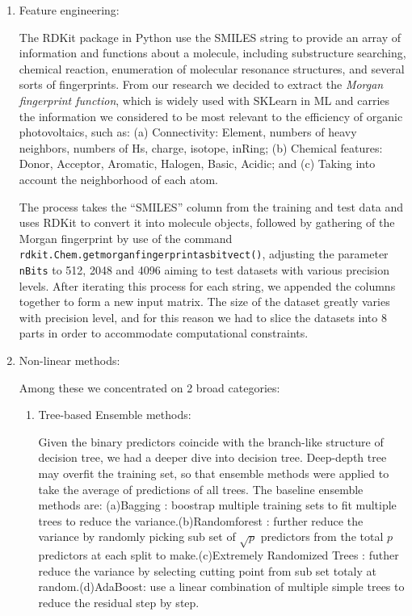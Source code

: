 \documentclass[11pt]{article}
\begin{document}
\begin{enumerate}

\item Feature engineering: 

The RDKit package in Python use the SMILES string to provide an array of information and functions about a molecule, including substructure searching, chemical reaction, enumeration of molecular resonance structures, and several sorts of fingerprints. From our research we decided to extract the \emph{Morgan fingerprint function}, which is widely used with SKLearn in ML and carries the information we considered to be most relevant to the efficiency of organic photovoltaics, such as: (a) Connectivity: Element, numbers of heavy neighbors, numbers of Hs, charge, isotope, inRing; (b) Chemical features: Donor, Acceptor, Aromatic, Halogen, Basic, Acidic; and (c) Taking into account the neighborhood of each atom.

The process takes the ``SMILES'' column from the training and test data and uses RDKit to convert it into molecule objects, followed by gathering of the Morgan fingerprint by use of the command \verb|rdkit.Chem.getmorganfingerprintasbitvect()|, adjusting the parameter \verb|nBits| to 512, 2048 and 4096 aiming to test datasets with various precision levels. After iterating this process for each string, we appended the columns together to form a new input matrix. The size of the dataset greatly varies with precision level, and for this reason we had to slice the datasets into 8 parts in order to accommodate computational constraints.

\item Non-linear methods: 

Among these we concentrated on 2 broad categories:

\begin{enumerate}

\item Tree-based Ensemble methods: 

Given the binary predictors coincide with the branch-like structure of decision tree, we had a deeper dive into decision tree. Deep-depth tree may overfit the training set,  so that ensemble methods were applied to take the average of predictions of all trees. The baseline ensemble methods are:
(a)Bagging : boostrap multiple training sets to fit multiple trees to reduce the variance.(b)Randomforest : further reduce the variance by randomly picking sub set of $\sqrt{p}$ predictors from the total $\mathit{p}$ predictors at each split to make.(c)Extremely Randomized Trees : futher reduce the variance by selecting cutting point from sub set totaly at random.(d)AdaBoost: use a linear combination of multiple simple trees to reduce the residual step by step.


\end{enumerate}
\end{enumerate}
\end{document}
